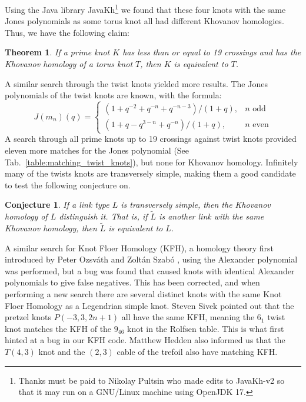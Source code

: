 \documentclass{article}
\theoremstyle{plain}
\newtheorem{theorem}{Theorem}
\newtheorem{conjecture}{Conjecture}
\begin{document}
        \par\hfill\par
        Using the Java library JavaKh\footnote{%
            Thanks must be paid to Nikolay Pultsin who made edits to
            JavaKh-v2 so that it may run on a GNU/Linux machine using
            OpenJDK 17.
        }
        we found that these four knots with the same Jones polynomials as some
        torus knot all had different Khovanov homologies. Thus, we have the
        following claim:
        \begin{theorem}
            If a prime knot $K$ has less than or equal to 19 crossings and has
            the Khovanov homology of a torus knot $T$,
            then $K$ is equivalent to $T$.
        \end{theorem}
        A similar search through the twist knots yielded more results.
        The Jones polynomials of the twist knots are known, with the formula:
        \begin{equation}
            J(m_{n})(q)=
            \begin{cases}
                (1+q^{-2}+q^{-n}+q^{-n-3})/(1+q),&n\textrm{ odd}\\
                (1+q-q^{3-n}+q^{-n})/(1+q),&n\textrm{ even}
            \end{cases}
        \end{equation}
        A search through all prime knots up to 19 crossings against twist knots
        provided eleven more matches for the Jones polynomial
        (See Tab.~\ref{table:matching_twist_knots}), but
        none for Khovanov homology. Infinitely many of the twists knots are
        transversely simple, making them a good candidate to test the following
        conjecture on.
        \begin{conjecture}
            If a link type $L$ is transversely simple, then the Khovanov
            homology of $L$ distinguish it. That is, if $\tilde{L}$
            is another link with the same Khovanov homology, then $\tilde{L}$ is
            equivalent to $L$.
        \end{conjecture}
        A similar search for Knot Floer Homology (KFH), a homology theory
        first introduced by Peter Ozsv\'{a}th and Zolt\'{a}n Szab\'{o}
        \cite{ozsvathszabo2004}, using the Alexander polynomial
        was performed, but a bug was found that caused knots with identical
        Alexander polynomials to give false negatives. This has been corrected,
        and when performing a new search there are several distinct knots
        with the same Knot Floer Homology as a Legendrian simple knot. Steven
        Sivek pointed
        out that the pretzel knots $P(-3,3,2n+1)$ all have the same KFH, meaning
        the $6_{1}$ twist knot matches the KFH of the $9_{46}$ knot in the
        Rolfsen table. This is what first hinted at a bug in our KFH code.
        Matthew Hedden also informed us that the $T(4,3)$ knot and the
        $(2,3)$ cable of the trefoil also have matching KFH.
\end{document}
